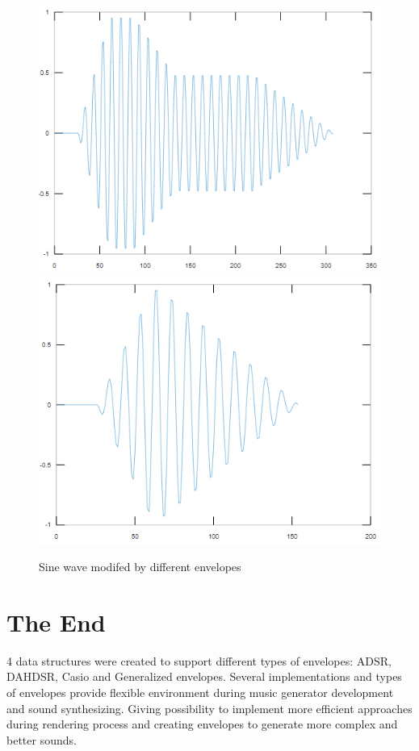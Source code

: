 \documentclass[runningheads]{llncs}
\begin{document}
\begin{figure}[ht!]

\center
\includegraphics[scale=0.3]{sine1.png}
\includegraphics[scale=0.3]{sine2.png}
\caption{Sine wave modifed by different envelopes}

\end{figure}

\section{The End}

4 data structures were created to support different types of envelopes: ADSR, DAHDSR, Casio and Generalized envelopes. Several implementations and types of envelopes provide flexible environment during music generator development and sound synthesizing. Giving possibility to implement more efficient approaches during rendering process and creating envelopes to generate more complex and better sounds.
\end{document}
